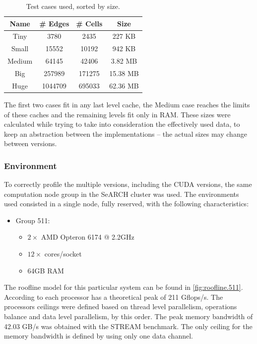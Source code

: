 \documentclass[9pt,twocolumn]{scrartcl}
\begin{document}
\begin{table}[!htp]
	\begin{center}
		\begin{tabular}{|c|c|c|c|}
\hline
\textbf{Name} & \textbf{\# Edges} & \textbf{\# Cells} & \textbf{Size}	\\
\hline
Tiny	 & 3780 & 2435 & 227 KB	\\
Small & 15552 & 10192 & 942 KB	\\
Medium & 64145 & 42406 & 3.82 MB	\\
Big & 257989 & 171275 & 15.38 MB	\\
Huge	 & 1044709 & 695033 & 62.36 MB	\\
\hline
		\end{tabular}
	\end{center}
	\caption{Test cases used, sorted by size.}
	\label{tab:testcases}
\end{table}

The first two cases fit in any last level cache, the Medium case reaches the limits of these caches and the remaining levels fit only in RAM. These sizes were calculated while trying to take into consideration the effectively used data, to keep an abstraction between the implementations -- the actual sizes may change between versions.\\

\subsubsection{Environment}
\label{subsubsec:env}
To correctly profile the multiple versions, including the CUDA versions, the same computation node group in the SeARCH cluster was used. The environments used consisted in a single node, fully reserved, with the following characteristics:
\begin{itemize}
\item{Group 511:
	\begin{itemize}
	\item{$2\times$ AMD Opteron 6174 @ 2.2GHz}
	\item{$12\times$ cores/socket}
	\item{64GB RAM}
	\end{itemize}
	}
\end{itemize}

The roofline model for this particular system can be found in \autoref{fig:roofline.511}. According to \cite{AMD6100} each processor has a theoretical peak of 211 Gflops/s. The processors ceilings were defined based on thread level parallelism, operations balance and data level parallelism, by this order. The peak memory bandwidth of 42.03 GB/s was obtained with the STREAM benchmark. The only ceiling for the memory bandwidth is defined by using only one data channel.\\
\end{document}
